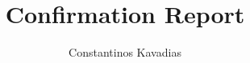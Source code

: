 \documentclass{article}
\begin{document}
\title{Confirmation Report}
\author{Constantinos Kavadias}

\maketitle


\printbibliography
\end{document}
